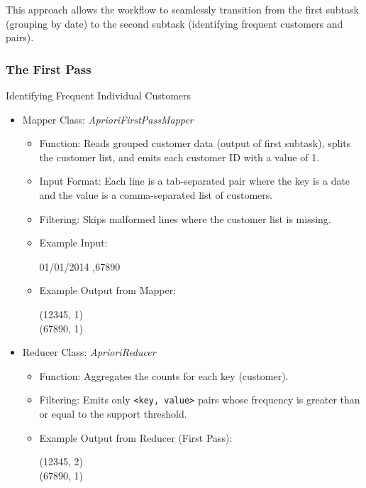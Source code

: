 This approach allows the workflow to seamlessly transition from the first subtask (grouping by date) to the second subtask (identifying frequent customers and pairs).

\subsubsection{The First Pass} Identifying Frequent Individual Customers

\begin{itemize}
    \item Mapper Class: \textit{AprioriFirstPassMapper}
    \begin{itemize}
        \item Function: Reads grouped customer data (output of first subtask), splits the customer list, and emits each customer ID with a value of 1.
        \item Input Format: Each line is a tab-separated pair where the key is a date and the value is a comma-separated list of customers.
        \item Filtering: Skips malformed lines where the customer list is missing.
        \item Example Input:
        \begin{center}
            01/01/2014 ,67890
        \end{center}
        \item Example Output from Mapper:
        \begin{center}
        (12345, 1)\\
        (67890, 1)
        \end{center}
    \end{itemize}

    \item Reducer Class: \textit{AprioriReducer}
    \begin{itemize}
        \item Function: Aggregates the counts for each key (customer).
        \item Filtering: Emits only \texttt{<key, value>} pairs whose frequency is greater than or equal to the support threshold.
        \item Example Output from Reducer (First Pass):
        \begin{center}
        (12345, 2)\\
        (67890, 1)
        \end{center}
    \end{itemize}
\end{itemize}

